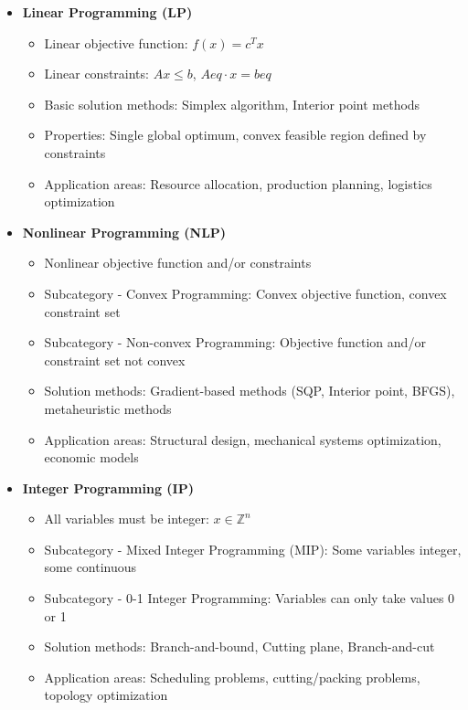 \begin{itemize}
    \item \textbf{Linear Programming (LP)}
        \begin{itemize}
            \item Linear objective function: $f(x) = c^T x$
            \item Linear constraints: $Ax \leq b$, $Aeq \cdot x = beq$
            \item Basic solution methods: Simplex algorithm, Interior point methods
            \item Properties: Single global optimum, convex feasible region defined by constraints
            \item Application areas: Resource allocation, production planning, logistics optimization
        \end{itemize}
        
    \item \textbf{Nonlinear Programming (NLP)}
        \begin{itemize}
            \item Nonlinear objective function and/or constraints
            \item Subcategory - Convex Programming: Convex objective function, convex constraint set
            \item Subcategory - Non-convex Programming: Objective function and/or constraint set not convex
            \item Solution methods: Gradient-based methods (SQP, Interior point, BFGS), metaheuristic methods
            \item Application areas: Structural design, mechanical systems optimization, economic models
        \end{itemize}
        
    \item \textbf{Integer Programming (IP)}
        \begin{itemize}
            \item All variables must be integer: $x \in \mathbb{Z}^n$
            \item Subcategory - Mixed Integer Programming (MIP): Some variables integer, some continuous
            \item Subcategory - 0-1 Integer Programming: Variables can only take values 0 or 1
            \item Solution methods: Branch-and-bound, Cutting plane, Branch-and-cut
            \item Application areas: Scheduling problems, cutting/packing problems, topology optimization
        \end{itemize}
        

\end{itemize}
